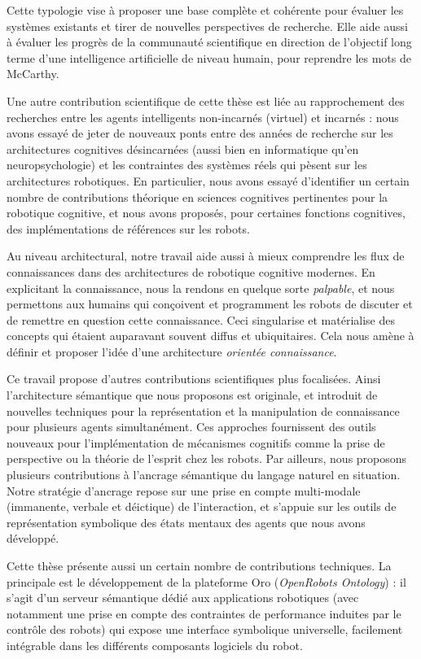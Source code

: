 Cette typologie vise à proposer une base complète et cohérente pour évaluer les
systèmes existants et tirer de nouvelles perspectives de recherche. Elle aide
aussi à évaluer les progrès de la communauté scientifique en direction de
l'objectif long terme d'une intelligence artificielle de niveau humain, pour
reprendre les mots de McCarthy.

Une autre contribution scientifique de cette thèse est liée au rapprochement
des recherches entre les agents intelligents non-incarnés (virtuel) et incarnés
: nous avons essayé de jeter de nouveaux ponts entre des années de recherche
sur les architectures cognitives désincarnées (aussi bien en informatique qu'en
neuropsychologie) et les contraintes des systèmes réels qui pèsent sur les
architectures robotiques. En particulier, nous avons essayé d'identifier un
certain nombre de contributions théorique en sciences cognitives pertinentes
pour la robotique cognitive, et nous avons proposés, pour certaines fonctions
cognitives, des implémentations de références sur les robots.

Au niveau architectural, notre travail aide aussi à mieux comprendre les flux
de connaissances dans des architectures de robotique cognitive modernes. En
explicitant la connaissance, nous la rendons en quelque sorte \emph{palpable},
et nous permettons aux humains qui conçoivent et programment les robots de
discuter et de remettre en question cette connaissance. Ceci singularise et
matérialise des concepts qui étaient auparavant souvent diffus et ubiquitaires.
Cela nous amène à définir et proposer l'idée d'une architecture \emph{orientée
connaissance}.

Ce travail propose d'autres contributions scientifiques plus focalisées. Ainsi
l'architecture sémantique que nous proposons est originale, et introduit de
nouvelles techniques pour la représentation et la manipulation de connaissance
pour plusieurs agents simultanément. Ces approches fournissent des outils
nouveaux pour l'implémentation de mécanismes cognitifs comme la prise de
perspective ou la théorie de l'esprit chez les robots. Par ailleurs, nous
proposons plusieurs contributions à l'ancrage sémantique du langage naturel en
situation. Notre stratégie d'ancrage repose sur une prise en compte
multi-modale (immanente, verbale et déictique) de l'interaction, et s'appuie
sur les outils de représentation symbolique des états mentaux des agents que
nous avons développé.

Cette thèse présente aussi un certain nombre de contributions techniques. La
principale est le développement de la plateforme {\sc Oro} (\emph{OpenRobots
Ontology}) : il s'agit d'un serveur sémantique dédié aux applications
robotiques (avec notamment une prise en compte des contraintes de performance
induites par le contrôle des robots) qui expose une interface symbolique
universelle, facilement intégrable dans les différents composants logiciels du
robot.

